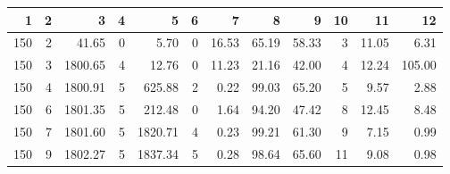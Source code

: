 \begin{tabular}{rrrrrrrrrrrr}
\toprule
1 & 2 & 3 & 4 & 5 & 6 & 7 & 8 & 9 & 10 & 11 & 12 \\
\midrule
150 & 2 & 41.65 & 0 & 5.70 & 0 & 16.53 & 65.19 & 58.33 & 3 & 11.05 & 6.31 \\
150 & 3 & 1800.65 & 4 & 12.76 & 0 & 11.23 & 21.16 & 42.00 & 4 & 12.24 & 105.00 \\
150 & 4 & 1800.91 & 5 & 625.88 & 2 & 0.22 & 99.03 & 65.20 & 5 & 9.57 & 2.88 \\
150 & 6 & 1801.35 & 5 & 212.48 & 0 & 1.64 & 94.20 & 47.42 & 8 & 12.45 & 8.48 \\
150 & 7 & 1801.60 & 5 & 1820.71 & 4 & 0.23 & 99.21 & 61.30 & 9 & 7.15 & 0.99 \\
150 & 9 & 1802.27 & 5 & 1837.34 & 5 & 0.28 & 98.64 & 65.60 & 11 & 9.08 & 0.98 \\
\bottomrule
\end{tabular}
